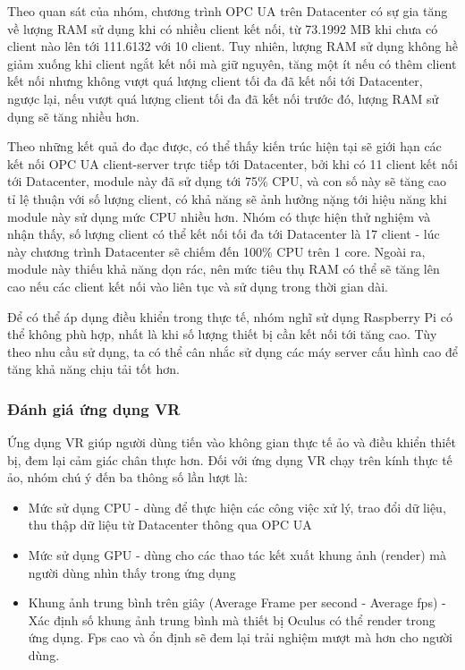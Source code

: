 Theo quan sát của nhóm, chương trình OPC UA trên Datacenter có sự gia tăng về lượng RAM sử dụng khi có nhiều client kết nối, từ 73.1992 MB khi chưa có client nào lên tới 111.6132 với 10 client. Tuy nhiên, lượng RAM sử dụng không hề giảm xuống khi client ngắt kết nối mà giữ nguyên, tăng một ít nếu có thêm client kết nối nhưng không vượt quá lượng client tối đa đã kết nối tới Datacenter, ngược lại, nếu vượt quá lượng client tối đa đã kết nối trước đó, lượng RAM sử dụng sẽ tăng nhiều hơn.

Theo những kết quả đo đạc được, có thể thấy kiến trúc hiện tại sẽ giới hạn các kết nối OPC UA client-server trực tiếp tới Datacenter, bởi khi có 11 client kết nối tới Datacenter, module này đã sử dụng tới 75\% CPU, và con số này sẽ tăng cao tỉ lệ thuận với số lượng client, có khả năng sẽ ảnh hưởng nặng tới hiệu năng khi module này sử dụng mức CPU nhiều hơn. Nhóm có thực hiện thử nghiệm và nhận thấy, số lượng client có thể kết nối tối đa tới Datacenter là 17 client - lúc này chương trình Datacenter sẽ chiếm đến 100\% CPU trên 1 core. Ngoài ra, module này thiếu khả năng dọn rác, nên mức tiêu thụ RAM có thể sẽ tăng lên cao nếu các client kết nối vào liên tục và sử dụng trong thời gian dài.

Để có thể áp dụng điều khiển trong thực tế, nhóm nghĩ sử dụng Raspberry Pi có thể không phù hợp, nhất là khi số lượng thiết bị cần kết nối tới tăng cao. Tùy theo nhu cầu sử dụng, ta có thể cân nhắc sử dụng các máy server cấu hình cao để tăng khả năng chịu tải tốt hơn.

\subsubsection{Đánh giá ứng dụng VR}

Ứng dụng VR giúp người dùng tiến vào không gian thực tế ảo và điều khiển thiết bị, đem lại cảm giác chân thực hơn. Đối với ứng dụng VR chạy trên kính thực tế ảo, nhóm chú ý đến ba thông số lần lượt là:
\begin{itemize}
    \item Mức sử dụng CPU - dùng để thực hiện các công việc xử lý, trao đổi dữ liệu, thu thập dữ liệu từ Datacenter thông qua OPC UA
    \item Mức sử dụng GPU - dùng cho các thao tác kết xuất khung ảnh (render) mà người dùng nhìn thấy trong ứng dụng
    \item Khung ảnh trung bình trên giây (Average Frame per second - Average fps) - Xác định số khung ảnh trung bình mà thiết bị Oculus có thể render trong ứng dụng. Fps cao và ổn định sẽ đem lại trải nghiệm mượt mà hơn cho người dùng.
\end{itemize}

